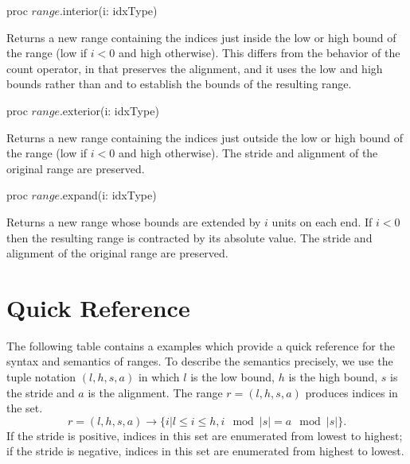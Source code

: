 \begin{protohead}
proc $range$.interior(i: idxType)
\end{protohead}
\begin{protobody}
Returns a new range containing the indices just inside the low or high bound of
the range (low if $i < 0$ and high otherwise).
This differs from the behavior of the count operator, in that 
preserves the alignment, and it uses the low and high bounds rather
than  and  to establish the bounds of the resulting range.
\end{protobody}

\begin{protohead}
proc $range$.exterior(i: idxType)
\end{protohead}
\begin{protobody}
Returns a new range containing the indices just outside the low or high bound of
the range (low if $i < 0$ and high otherwise).  The stride and alignment of the
original range are preserved.
\end{protobody}

\begin{protohead}
proc $range$.expand(i: idxType)
\end{protohead}
\begin{protobody}
Returns a new range whose bounds are extended by $i$ units on each end.  If $i <
0$ then the resulting range is contracted by its absolute value.
The stride and alignment of the original range are preserved.
\end{protobody}

\begin{protohead}
\end{protohead}
\begin{protobody}
\end{protobody}

\section{Quick Reference}

The following table contains a examples which provide a quick reference for the
syntax and semantics of ranges.  To describe the semantics precisely, we use the
tuple notation $(l, h, s, a)$ in which $l$ is the low bound, $h$ is the high
bound, $s$ is the stride and $a$ is the alignment.  The range $r = (l, h, s, a)$
produces indices in the set.
\begin{equation}
r = (l, h, s, a) \rightarrow \{i | l \le i \le h, i\!\mod |s| = a\!\mod |s|\}.
\end{equation}
\noindent If the stride is positive, indices in this set are enumerated from lowest to
highest; if the stride is negative, indices in this set are enumerated from
highest to lowest.  

